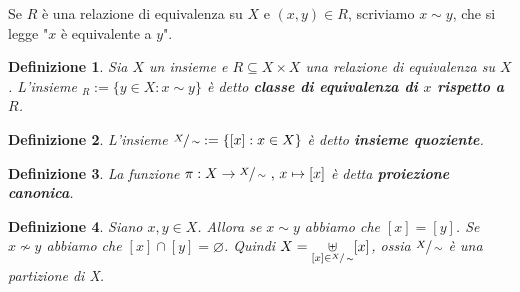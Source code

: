 \documentclass[a4paper,12pt]{article}
\theoremstyle{def}
\newtheorem*{definition}{Definizione}
\theoremstyle{prop}
\theoremstyle{esempio}
\theoremstyle{dimostrazione}
\theoremstyle{teo}
\theoremstyle{osservazione}
\begin{document}
Se \(R\) è una relazione di equivalenza su \(X\) e \((x,y) \in R\), scriviamo \(x \sim y\),
che si legge "\(x\) è equivalente a \(y\)".

\begin{definition}
    Sia \(X\) un insieme e \(R \subseteq X \times X\) una relazione di equivalenza su \(X\). L'insieme
    \begin{math}
        [x]_R := \{y \in X : x \sim y\}
    \end{math} è detto \textbf{classe di equivalenza di \(x\) rispetto a \(R\)}.
\end{definition}

\begin{definition}
    L'insieme \(\sfrac{X}{\sim} := \{[x] : x \in X\}\) è detto \textbf{insieme quoziente}.
\end{definition}

\begin{definition}
    La funzione \begin{math}
        \pi : X \rightarrow \sfrac{X}{\sim} \text{ , } x \mapsto [x] \end{math} è detta \textbf{proiezione canonica}.
\end{definition}

\begin{definition}
    Siano \(x,y \in X\). Allora se \(x \sim y\) abbiamo che \([x] = [y]\).
    Se \(x \nsim y\) abbiamo che \([x] \cap [y] = \varnothing\).
    Quindi \(X = \underset{[x] \in \sfrac{X}{\sim}}{\uplus} [x]\), ossia \(\sfrac{X}{\sim}\) è una partizione di X.
\end{definition}
\end{document}
